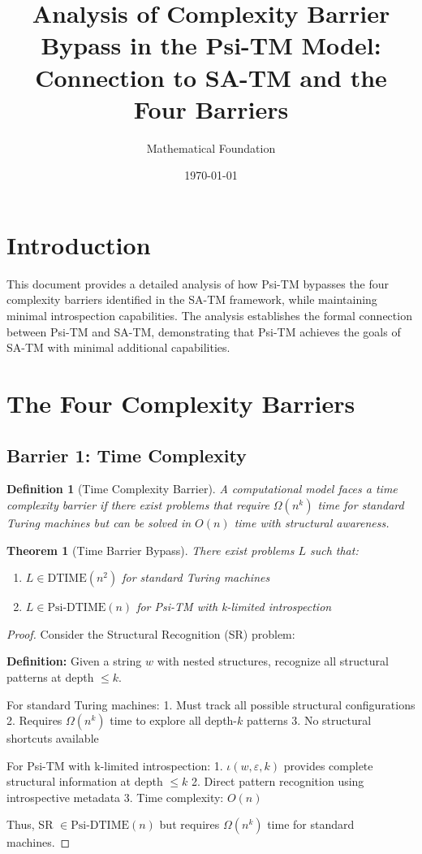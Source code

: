 \documentclass[11pt]{article}
\title{Analysis of Complexity Barrier Bypass in the Psi-TM Model:\\
Connection to SA-TM and the Four Barriers}
\author{Mathematical Foundation}
\date{\today}
\newtheorem{definition}{Definition}
\newtheorem{theorem}{Theorem}
\begin{document}
\maketitle

\section{Introduction}

This document provides a detailed analysis of how Psi-TM bypasses the four complexity barriers identified in the SA-TM framework, while maintaining minimal introspection capabilities. The analysis establishes the formal connection between Psi-TM and SA-TM, demonstrating that Psi-TM achieves the goals of SA-TM with minimal additional capabilities.

\section{The Four Complexity Barriers}

\subsection{Barrier 1: Time Complexity}

\begin{definition}[Time Complexity Barrier]
A computational model faces a time complexity barrier if there exist problems that require $\Omega(n^k)$ time for standard Turing machines but can be solved in $O(n)$ time with structural awareness.
\end{definition}

\begin{theorem}[Time Barrier Bypass]
There exist problems $L$ such that:
\begin{enumerate}
\item $L \in \text{DTIME}(n^2)$ for standard Turing machines
\item $L \in \text{Psi-DTIME}(n)$ for Psi-TM with k-limited introspection
\end{enumerate}
\end{theorem}

\begin{proof}
Consider the Structural Recognition (SR) problem:

\textbf{Definition:} Given a string $w$ with nested structures, recognize all structural patterns at depth $\leq k$.

For standard Turing machines:
1. Must track all possible structural configurations
2. Requires $\Omega(n^k)$ time to explore all depth-$k$ patterns
3. No structural shortcuts available

For Psi-TM with k-limited introspection:
1. $\iota(w, \varepsilon, k)$ provides complete structural information at depth $\leq k$
2. Direct pattern recognition using introspective metadata
3. Time complexity: $O(n)$

Thus, SR $\in \text{Psi-DTIME}(n)$ but requires $\Omega(n^k)$ time for standard machines.
\end{proof}
\end{document}
